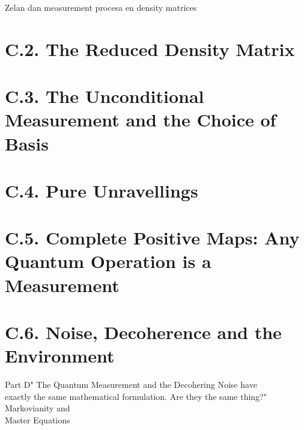 \documentclass[11pt, a4paper]{article} %
\begin{document}
Zelan dan measurement procesa en density matrices
\fi

\section*{C.2. The Reduced Density Matrix}

\section*{C.3. The Unconditional Measurement and the Choice of Basis}

\section*{C.4. Pure Unravellings}

\section*{C.5. Complete Positive Maps: Any Quantum Operation is a Measurement}


\section*{C.6. Noise, Decoherence and the Environment}


\begin{kapituloBerria}{Part D}{" The Quantum Measurement and the Decohering Noise have\\ exactly the same mathematical formulation. Are they the same thing?"}
Markovianity and\\ Master Equations
\end{kapituloBerria}
\newpage
\fancyhead[L]{\null}
\fancyhead[R]{\null}
\null
\clearpage
\end{document}
